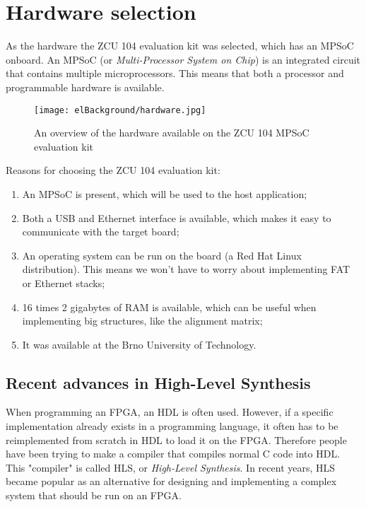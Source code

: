 \section{Hardware selection}

As the hardware the ZCU 104 evaluation kit was selected, which has an MPSoC onboard. An MPSoC (or \emph{Multi-Processor System on Chip}) is an integrated circuit that contains multiple microprocessors. This means that both a processor and programmable hardware is available.

\begin{figure}[H]
	\centering
	\texttt{[image: elBackground/hardware.jpg]}
	\caption{An overview of the hardware available on the ZCU 104 MPSoC evaluation kit}
	\label{fig:hardware}
\end{figure}

Reasons for choosing the ZCU 104 evaluation kit:
\begin{enumerate}
	\item An MPSoC is present, which will be used to the host application;
	\item Both a USB and Ethernet interface is available, which makes it easy to communicate with the target board;
	\item An operating system can be run on the board (a Red Hat Linux distribution). This means we won't have to worry about implementing FAT or Ethernet stacks;
	\item 16 times 2 gigabytes of RAM is available, which can be useful when implementing big structures, like the alignment matrix;
	\item It was available at the Brno University of Technology.
\end{enumerate}

\subsection{Recent advances in High-Level Synthesis}

When programming an FPGA, an HDL is often used. However, if a specific implementation already exists in a programming language, it often has to be reimplemented from scratch in HDL to load it on the FPGA. Therefore people have been trying to make a compiler that compiles normal C code into HDL. This "compiler" is called HLS, or \emph{ High-Level Synthesis}. In recent years, HLS became popular as an alternative for designing and implementing a complex system that should be run on an FPGA.

